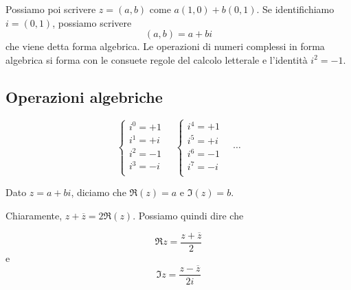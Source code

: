 \documentclass[a4paper]{article}
\begin{document}
Possiamo poi scrivere \(z=(a,b)\) come \(a(1,0) + b(0,1)\).
Se identifichiamo \(i=(0,1)\), possiamo scrivere
\[
    (a,b) = a+bi
\]
che viene detta forma algebrica.
Le operazioni di numeri complessi in forma algebrica si forma con le consuete regole del calcolo letterale
e l'identità \(i^2 = -1\).

\subsection{Operazioni algebriche}

\[
    \begin{cases}
        i^0=+1\\
        i^1=+i\\
        i^2=-1\\
        i^3=-i\\
    \end{cases}
    \quad
    \begin{cases}
        i^4=+1\\
        i^5=+i\\
        i^6=-1\\
        i^7=-i\\
    \end{cases}
    \quad
    \cdots
\]

Dato \(z=a+bi\), diciamo che \(\Re(z) =a\) e \(\Im(z) = b\).


Chiaramente, \(z + \overline{z} = 2\Re(z)\). Possiamo quindi dire che

\[
    \Re z = \frac{z + \overline{z}}{2}
\]
e
\[
    \Im z = \frac{z-\overline{z}}{2i}
\]

\end{document}

